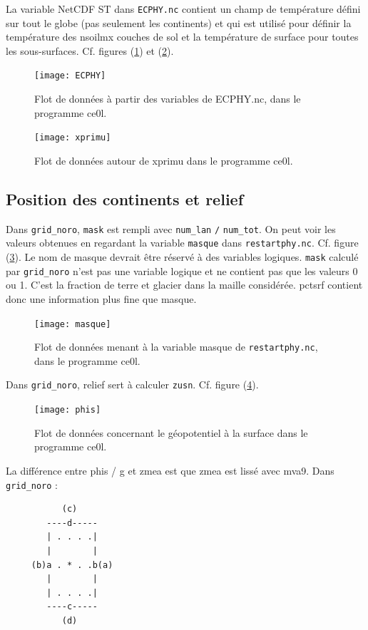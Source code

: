 \documentclass[a4paper,english,french]{article}
\begin{document}
La variable NetCDF ST dans \verb+ECPHY.nc+ contient un champ de
température défini sur tout le globe (pas seulement les continents) et
qui est utilisé pour définir la température des nsoilmx couches de sol
et la température de surface pour toutes les
sous-surfaces. Cf. figures (\ref{fig:ECPHY}) et (\ref{fig:xprimu}).
\begin{figure}
  \centering
  \texttt{[image: ECPHY]}
  \caption[Flot de données : ECPHY.nc dans ce0l]{Flot de données à
    partir des variables de ECPHY.nc, dans le programme ce0l.}
  \label{fig:ECPHY}
\end{figure}
\begin{figure}
  \centering
  \texttt{[image: xprimu]}
  \caption[Flot de données : xprimu dans ce0l]{Flot de données autour
    de xprimu dans le programme ce0l.}
  \label{fig:xprimu}
\end{figure}

\subsection{Position des continents et relief}

Dans \verb+grid_noro+, \verb+mask+ est rempli avec \verb+num_lan+
\verb+/+ \verb+num_tot+. On peut voir les valeurs obtenues en
regardant la variable \verb+masque+ dans
\verb+restartphy.nc+. Cf. figure (\ref{fig:masque}). Le nom de masque
devrait être réservé à des variables logiques. \verb+mask+ calculé par
\verb+grid_noro+ n'est pas une variable logique et ne contient pas que
les valeurs 0 ou 1. C'est la fraction de terre et glacier dans la
maille considérée. pctsrf contient donc une information plus fine que
masque.

\begin{figure}
  \centering
  \texttt{[image: masque]}
  \caption[Flot de données : masque de \texttt{restartphy.nc} dans
  ce0l]{Flot de données menant à la variable masque de
    \texttt{restartphy.nc}, dans le programme ce0l.}
  \label{fig:masque}
\end{figure}

Dans \verb+grid_noro+, relief sert à calculer \verb+zusn+. Cf. figure
(\ref{fig:phis}).
\begin{figure}
  \centering
  \texttt{[image: phis]}
  \caption[Flot de données : géopotentiel à la surface dans ce0l]{Flot
    de données concernant le géopotentiel à la surface dans le
    programme ce0l.}
  \label{fig:phis}
\end{figure}
La différence entre phis / g et zmea est que zmea est lissé avec mva9.
Dans \verb+grid_noro+ :
\begin{verbatim}
           (c)
        ----d-----
        | . . . .|
        |        |
     (b)a . * . .b(a)
        |        |
        | . . . .|
        ----c-----
           (d)
\end{verbatim}
\end{document}
